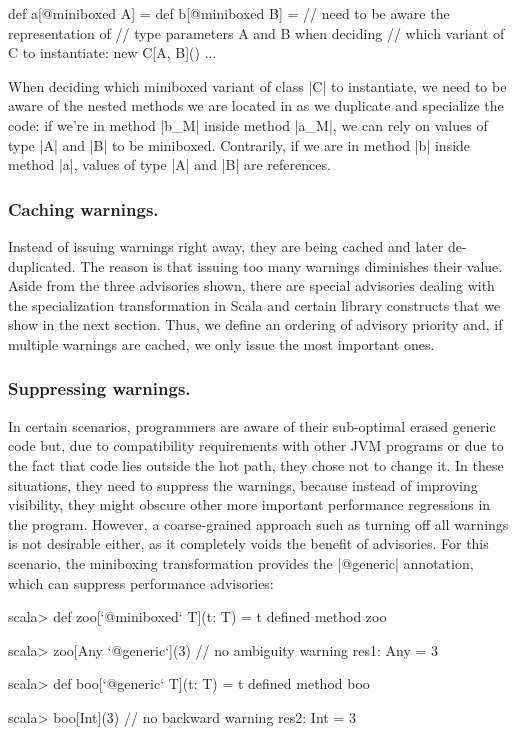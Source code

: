 \begin{lstlisting-nobreak}
 def a[@miniboxed A] = {
   def b[@miniboxed B] = {
     // need to be aware the representation of
     // type parameters A and B when deciding
     // which variant of C to instantiate:
     new C[A, B]()
   }
   ...
 }
\end{lstlisting-nobreak}

When deciding which miniboxed variant of class |C| to instantiate, we need to be aware of the nested methods we are located in as we duplicate and specialize the code: if we're in method |b_M| inside method |a_M|, we can rely on values of type |A| and |B| to be miniboxed. Contrarily, if we are in method |b| inside method |a|, values of type |A| and |B| are references.

\vspace{-0.5em}

\subsubsection{Caching warnings.} Instead of issuing warnings right away, they are being cached and later de-duplicated. The reason is that issuing too many warnings diminishes their value. Aside from the three advisories shown, there are special advisories dealing with the specialization transformation in Scala and certain library constructs that we show in the next section. Thus, we define an ordering of advisory priority and, if multiple warnings are cached, we only issue the most important ones.

\subsubsection{Suppressing warnings.} In certain scenarios, programmers are aware of their sub-optimal erased generic code but, due to compatibility requirements with other JVM programs or due to the fact that code lies outside the hot path, they chose not to change it. In these situations, they need to suppress the warnings, because instead of improving visibility, they might obscure other more important performance regressions in the program. However, a coarse-grained approach such as turning off all warnings is not desirable either, as it completely voids the benefit of advisories. For this scenario, the miniboxing transformation provides the |@generic| annotation, which can suppress performance advisories:

\begin{lstlisting-nobreak}
 scala> def zoo[`@miniboxed` T](t: T) = t
 defined method zoo

 scala> zoo[Any `@generic`](3) // no ambiguity warning
 res1: Any = 3

 scala> def boo[`@generic` T](t: T) = t
 defined method boo

 scala> boo[Int](3)                   // no backward warning
 res2: Int = 3
\end{lstlisting-nobreak}

